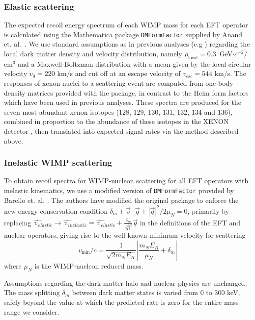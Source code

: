 \subsubsection{Elastic scattering}
\label{subsubsec:Elastic}

The expected recoil energy spectrum of each WIMP mass for each EFT operator is calculated using the Mathematica package \texttt{DMFormFactor} supplied by Anand et. al.~\cite{Fitzpatrick:MathTools,Anand:MathTools}. We use standard assumptions as in previous analyses (e.g \cite{xe100_run_combination}) regarding the local dark matter density and velocity distribution, namely $\rho_\mathrm{local} = 0.3$~GeV$\cdot c^{-2}$/$\mathrm{cm}^{3}$ and a Maxwell-Boltzman distribution with a mean given by the local circular velocity $v_0 = 220$ km/s and cut off at an escape velocity of $v_\mathrm{esc} = 544$ km/s. The responses of xenon nuclei to a scattering event are computed from one-body density matrices provided with the package, in contrast to the Helm form factors which have been used in previous analyses. These spectra are produced for the seven most abundant xenon isotopes (128, 129, 130, 131, 132, 134 and 136), combined in proportion to the abundance of these isotopes in the XENON detector \cite{xe100_run10_sd}, then translated into expected signal rates via the method described above.

\subsubsection{Inelastic WIMP scattering}
\label{subsubsec:Inelastic}
To obtain recoil spectra for WIMP-nucleon scattering for all EFT operators with inelastic kinematics, we use a modified version of \texttt{DMFormFactor} provided by Barello et. al. \cite{InelasticMath}. The authors have modified the original package to enforce the new energy conservation condition $\delta_m + \vec{v}\cdot\vec{q} + \left|\vec{q}\right|^2/2\mu_N = 0$, primarily by replacing 
$\vec{v}^\perp_{elastic} \rightarrow \vec{v}^\perp_{inelastic} = \vec{v}^\perp_{elastic} +\frac{\delta_m}{\vert{\vec{q}}\vert^2}\vec{q}$ in the definitions of the EFT and nuclear operators, giving rise to the well-known minimum velocity for scattering
\begin{equation}
  v_\mathrm{min}/c = \frac{1}{\sqrt{2 m_N E_R}} \left|\frac{m_N E_R}{\mu_N} + \delta_m\right|
\end{equation}
where $\mu_N$ is the WIMP-nucleon reduced mass.

Assumptions regarding the dark matter halo and nuclear physics are unchanged. The mass splitting $\delta_m$ between dark matter states is varied from 0 to 300 keV, safely beyond the value at which the predicted rate is zero for the entire mass range we consider.
